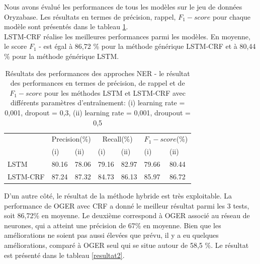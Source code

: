 Nous avons évalué les performances de tous les modèles sur le jeu de données Oryzabase. Les résultats en termes de précision, rappel, $ F_ {1} -score $ pour chaque modèle sont présentés dans le tableau \ref{result1}.\\

LSTM-CRF réalise les meilleures performances parmi les modèles. En moyenne, le score $ F_ {1} $ - est égal à 86,72 \% pour la méthode générique LSTM-CRF et à 80,44 \% pour la méthode générique LSTM.

\begin{center}
\begin{table}[h]
\begin{tabular}{ |p{2.5 cm}| p{1.5 cm}|p{1.5 cm}|p{1.5 cm}|p{1.5 cm}| p{1.5 cm}|p{1.5 cm}|} 
\hline
\multirow{2}{4em}{} & 
\multicolumn{2}{|c|}{Precision(\%)} 
& \multicolumn{2}{|c|}{Recall(\%)}
&\multicolumn{2}{|c|}{$F_{1}-score$(\%)} \\&
(i)&(ii)&(i)&(ii)&(i)&(ii) \\
\hline
LSTM & 80.16& 78.06& 79.16&82.97&79.66 &80.44 \\ 
\hline
LSTM-CRF &87.24&87.32&84.73&86.13&85.97&86.72 \\
\hline
\end{tabular}
\newline
\label{result1}
\caption[Résultats des performances des approches LSTM]{Résultats des performances des approches NER - le résultat des performances en termes de précision, de rappel et de $ F_ {1} -score $ pour les méthodes LSTM et LSTM-CRF avec différents paramètres d’entraînement: (i) learning rate = 0,001, dropout = 0,3, (ii) learning rate = 0,001, droupout = 0,5}
\end{table}
\end{center}

D'un autre côté, le résultat de la méthode hybride est très exploitable. La performance de OGER avec CRF a donné le meilleur résultat parmi les 3 tests, soit 86,72\% en moyenne. Le deuxième correspond à OGER associé au réseau de neurones, qui a atteint une précision de 67\% en moyenne. Bien que les améliorations ne soient pas aussi élevées que prévu, il y a eu quelques améliorations, comparé à OGER seul qui se situe autour de 58,5 \%. Le résultat est présenté dans le tableau \ref{resultat2}.

